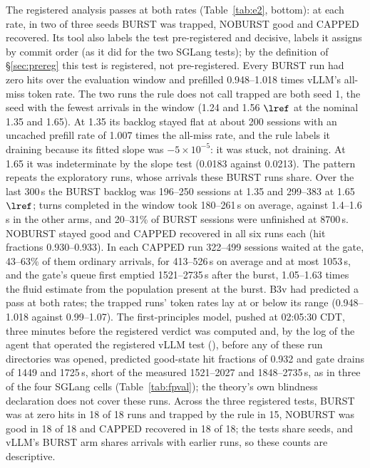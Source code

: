 The registered analysis passes at both rates (Table~\ref{tab:e2}, bottom): at each rate, in two of three seeds BURST was trapped, NOBURST good and CAPPED recovered. Its tool also labels the test pre-registered and decisive, labels it assigns by commit order (as it did for the two SGLang tests); by the definition of \S\ref{sec:prereg} this test is registered, not pre-registered. Every BURST run had zero hits over the evaluation window and prefilled 0.948--1.018 times vLLM's all-miss token rate. The two runs the rule does not call trapped are both seed 1, the seed with the fewest arrivals in the window (1.24 and 1.56 $\lref$ at the nominal 1.35 and 1.65). At 1.35 its backlog stayed flat at about 200 sessions with an uncached prefill rate of 1.007 times the all-miss rate, and the rule labels it draining because its fitted slope was $-5\times10^{-5}$\sps: it was stuck, not draining. At 1.65 it was indeterminate by the slope test (0.0183 against 0.0213). The pattern repeats the exploratory runs, whose arrivals these BURST runs share. Over the last 300\,s the BURST backlog was 196--250 sessions at 1.35 and 299--383 at 1.65 $\lref$; turns completed in the window took 180--261\,s on average, against 1.4--1.6\,s in the other arms, and 20--31\% of BURST sessions were unfinished at 8700\,s. NOBURST stayed good and CAPPED recovered in all six runs each (hit fractions 0.930--0.933). In each CAPPED run 322--499 sessions waited at the gate, 43--63\% of them ordinary arrivals, for 413--526\,s on average and at most 1053\,s, and the gate's queue first emptied 1521--2735\,s after the burst, 1.05--1.63 times the fluid estimate from the population present at the burst. B3v had predicted a pass at both rates; the trapped runs' token rates lay at or below its range (0.948--1.018 against 0.99--1.07). The first-principles model, pushed at 02:05:30 CDT, three minutes before the registered verdict was computed and, by the log of the agent that operated the registered vLLM test (), before any of these run directories was opened, predicted good-state hit fractions of 0.932 and gate drains of 1449 and 1725\,s, short of the measured 1521--2027 and 1848--2735\,s, as in three of the four SGLang cells (Table~\ref{tab:fpval}); the theory's own blindness declaration does not cover these runs. Across the three registered tests, BURST was at zero hits in 18 of 18 runs and trapped by the rule in 15, NOBURST was good in 18 of 18 and CAPPED recovered in 18 of 18; the tests share seeds, and vLLM's BURST arm shares arrivals with earlier runs, so these counts are descriptive.

